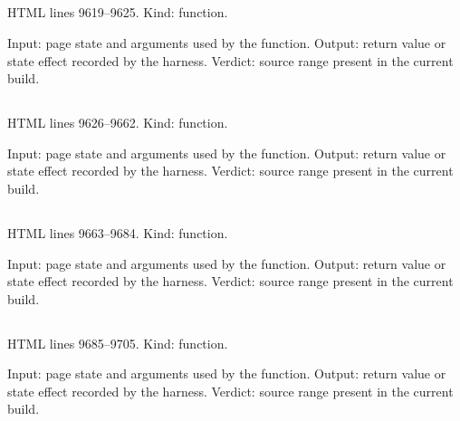 \subsection*{\texttt{}}
\label{vf_530_plateColour}
HTML lines 9619--9625. Kind: function.

Input: page state and arguments used by the function.
Output: return value or state effect recorded by the harness.
Verdict: source range present in the current build.

\subsection*{\texttt{}}
\label{vf_531_renderReviewPlate}
HTML lines 9626--9662. Kind: function.

Input: page state and arguments used by the function.
Output: return value or state effect recorded by the harness.
Verdict: source range present in the current build.

\subsection*{\texttt{}}
\label{vf_532_drawPlateMapImage}
HTML lines 9663--9684. Kind: function.

Input: page state and arguments used by the function.
Output: return value or state effect recorded by the harness.
Verdict: source range present in the current build.

\subsection*{\texttt{}}
\label{vf_533_renderReviewComparison}
HTML lines 9685--9705. Kind: function.

Input: page state and arguments used by the function.
Output: return value or state effect recorded by the harness.
Verdict: source range present in the current build.

